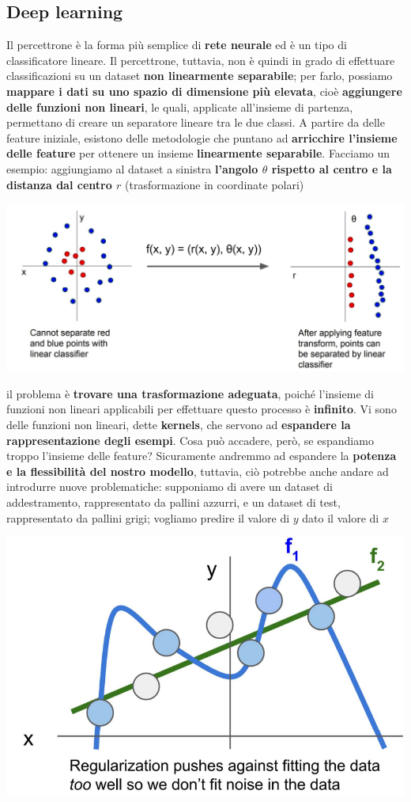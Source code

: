 \documentclass[12pt]{article}
\begin{document}
\subsection{Deep learning}
Il percettrone è la forma più semplice di \textbf{rete neurale} ed è un tipo di classificatore lineare.
Il percettrone, tuttavia, non è quindi in grado di effettuare classificazioni su un dataset \textbf{non linearmente separabile};
per farlo, possiamo \textbf{mappare i dati su uno spazio di dimensione più elevata}, cioè \textbf{aggiungere delle funzioni non lineari}, le quali, applicate all'insieme di partenza,
permettano di creare un separatore lineare tra le due classi. A partire da delle feature iniziale, esistono delle metodologie che puntano ad \textbf{arricchire l'insieme delle feature} per
ottenere un insieme \textbf{linearmente separabile}. 
Facciamo un esempio: aggiungiamo al dataset a sinistra \textbf{l'angolo $\theta$ rispetto al centro e la distanza dal centro $r$} (trasformazione in coordinate polari)
\begin{center}
    \includegraphics[width =0.90\linewidth]{Images/106.PNG}
\end{center}
il problema è \textbf{trovare una trasformazione adeguata}, poiché l'insieme di funzioni non lineari applicabili per effettuare questo processo è \textbf{infinito}.
Vi sono delle funzioni non lineari, dette \textbf{kernels}, che servono ad \textbf{espandere la rappresentazione degli esempi}.
Cosa può accadere, però, se espandiamo troppo l'insieme delle feature? Sicuramente andremmo ad espandere la \textbf{potenza e la flessibilità del nostro modello}, tuttavia, ciò potrebbe anche andare ad
introdurre nuove problematiche: supponiamo di avere un dataset di addestramento, rappresentato da pallini azzurri, e un dataset di test, rappresentato da pallini grigi; vogliamo predire il valore di $y$ dato il valore di $x$
\begin{center}
    \includegraphics[width =0.50\linewidth]{Images/107.PNG}
\end{center}
\end{document}

